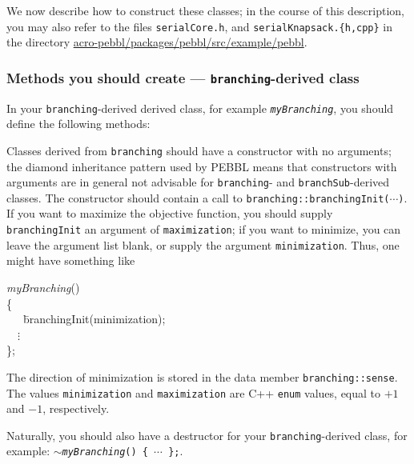 We now describe how to construct these classes; in the course of this
description, you may also refer to the files \texttt{serialCore.h},
and \texttt{serialKnapsack.\{h,cpp\}}
in the directory \url{acro-pebbl/packages/pebbl/src/example/pebbl}.

\subsubsection{Methods you should create ---
  \texttt{branching}-derived class}

In your \texttt{branching}-derived derived class, for example
\texttt{\emph{myBranching}}, you should define the following methods:

Classes derived from \texttt{branching} should have a constructor with
no arguments; the diamond inheritance pattern used by PEBBL means that
constructors with arguments are in general not advisable for 
\texttt{branching}- and \texttt{branchSub}-derived classes.  The
constructor should contain a call to
\texttt{branching::\linebreak[0]branchingInit($\cdots$)}. If you want
to maximize the objective function, you should supply
\texttt{branchingInit} an argument of \texttt{maximization}; if you
want to minimize, you can leave the argument list blank, or supply the
argument \texttt{minimization}.  Thus, one might have something like
\begin{codeblock}
\emph{myBranching}()  \\
\{ \\
~~~\=branchingInit(minimization); \\
\>~~$\vdots$ \\
\}; 
\end{codeblock}
The direction of minimization is stored in the data member
\texttt{branching::sense}.  The values \texttt{minimization} and
\texttt{maximization} are C++ \texttt{enum} values, equal to $+1$ and
$-1$, respectively.

Naturally, you should also have a destructor for your
\texttt{branching}-derived class, for example:
\texttt{$\sim$\emph{myBranching}() \{ $\cdots$ \};}.

